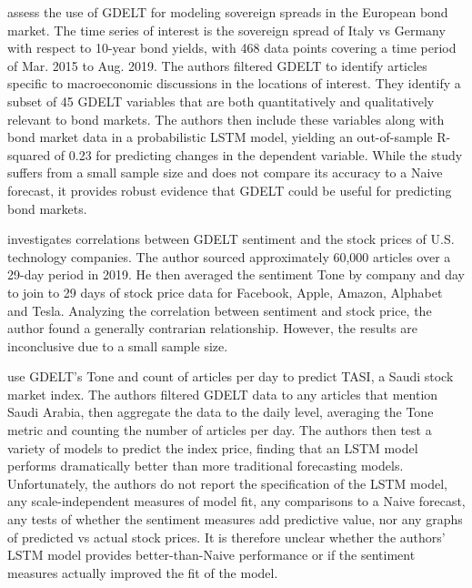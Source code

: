 \documentclass[12pt]{article}
\begin{document}
\citet{consoli2021information} assess the use of GDELT for modeling sovereign spreads in the European bond market. The time series of interest is the sovereign spread of Italy vs Germany with respect to 10-year bond yields, with 468 data points covering a time period of Mar. 2015 to Aug. 2019. The authors filtered GDELT to identify articles specific to macroeconomic discussions in the locations of interest. They identify a subset of 45 GDELT variables that are both quantitatively and qualitatively relevant to bond markets. The authors then include these variables along with bond market data in a probabilistic LSTM model, yielding an out-of-sample R-squared of 0.23 for predicting changes in the dependent variable. While the study suffers from a small sample size and does not compare its accuracy to a Naive forecast, it provides robust evidence that GDELT could be useful for predicting bond markets.

\citet{jakel2019using} investigates correlations between GDELT sentiment and the stock prices of U.S. technology companies. The author sourced approximately 60,000 articles over a 29-day period in 2019. He then averaged the sentiment Tone by company and day to join to 29 days of stock price data for Facebook, Apple, Amazon, Alphabet and Tesla. Analyzing the correlation between sentiment and stock price, the author found a generally contrarian relationship. However, the results are inconclusive due to a small sample size.

\cite{alamro2019predicting} use GDELT's Tone and count of articles per day to predict TASI, a Saudi stock market index. The authors filtered GDELT data to any articles that mention Saudi Arabia, then aggregate the data to the daily level, averaging the Tone metric and counting the number of articles per day. The authors then test a variety of models to predict the index price, finding that an LSTM model performs dramatically better than more traditional forecasting models. Unfortunately, the authors do not report the specification of the LSTM model, any scale-independent measures of model fit, any comparisons to a Naive forecast, any tests of whether the sentiment measures add predictive value, nor any graphs of predicted vs actual stock prices. It is therefore unclear whether the authors' LSTM model provides better-than-Naive performance or if the sentiment measures actually improved the fit of the model.
\end{document}
